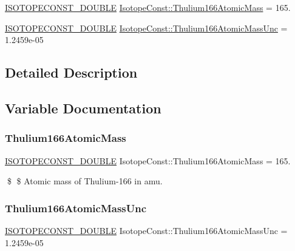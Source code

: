 \begin{DoxyCompactItemize}
\item 
\mbox{\hyperlink{group___isotope_const-_macros_ga8f45a7272ce02c0b4c65c44636ed719a}{I\+S\+O\+T\+O\+P\+E\+C\+O\+N\+S\+T\+\_\+\+D\+O\+U\+B\+LE}} \mbox{\hyperlink{group___isotope_const-_thulium-_tm166_gaa82f7e7e78c8e45595d84c181c85dcd7}{Isotope\+Const\+::\+Thulium166\+Atomic\+Mass}} = 165.
\item 
\mbox{\hyperlink{group___isotope_const-_macros_ga8f45a7272ce02c0b4c65c44636ed719a}{I\+S\+O\+T\+O\+P\+E\+C\+O\+N\+S\+T\+\_\+\+D\+O\+U\+B\+LE}} \mbox{\hyperlink{group___isotope_const-_thulium-_tm166_ga6b7e052afc2aadeb70bccc170044995e}{Isotope\+Const\+::\+Thulium166\+Atomic\+Mass\+Unc}} = 1.\+2459e-\/05
\end{DoxyCompactItemize}


\subsection{Detailed Description}


\subsection{Variable Documentation}
\mbox{\label{group___isotope_const-_thulium-_tm166_gaa82f7e7e78c8e45595d84c181c85dcd7}} 
\subsubsection{\texorpdfstring{Thulium166\+Atomic\+Mass}{Thulium166AtomicMass}}
{\footnotesize\ttfamily \mbox{\hyperlink{group___isotope_const-_macros_ga8f45a7272ce02c0b4c65c44636ed719a}{I\+S\+O\+T\+O\+P\+E\+C\+O\+N\+S\+T\+\_\+\+D\+O\+U\+B\+LE}} Isotope\+Const\+::\+Thulium166\+Atomic\+Mass = 165.}

\$ \$ Atomic mass of Thulium-\/166 in amu. \mbox{\label{group___isotope_const-_thulium-_tm166_ga6b7e052afc2aadeb70bccc170044995e}} 
\subsubsection{\texorpdfstring{Thulium166\+Atomic\+Mass\+Unc}{Thulium166AtomicMassUnc}}
{\footnotesize\ttfamily \mbox{\hyperlink{group___isotope_const-_macros_ga8f45a7272ce02c0b4c65c44636ed719a}{I\+S\+O\+T\+O\+P\+E\+C\+O\+N\+S\+T\+\_\+\+D\+O\+U\+B\+LE}} Isotope\+Const\+::\+Thulium166\+Atomic\+Mass\+Unc = 1.\+2459e-\/05}

